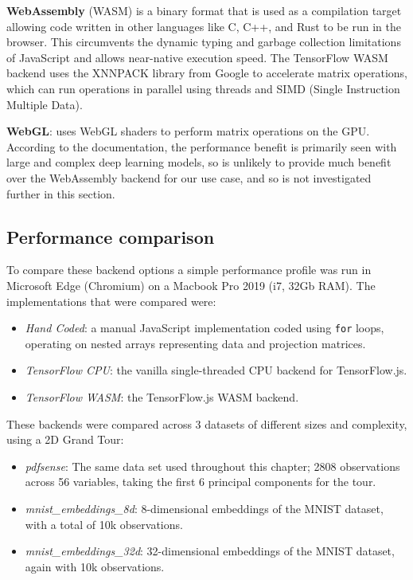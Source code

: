 \textbf{WebAssembly} (WASM) is a binary format that is used as a
compilation target allowing code written in other languages like C, C++,
and Rust to be run in the browser. This circumvents the dynamic typing
and garbage collection limitations of JavaScript and allows near-native
execution speed. The TensorFlow WASM backend uses the XNNPACK library
from Google to accelerate matrix operations, which can run operations in
parallel using threads and SIMD (Single Instruction Multiple Data).

\textbf{WebGL}: uses WebGL shaders to perform matrix operations on the
GPU. According to the documentation, the performance benefit is
primarily seen with large and complex deep learning models, so is
unlikely to provide much benefit over the WebAssembly backend for our
use case, and so is not investigated further in this section.

\hypertarget{performance-comparison}{%
\subsection{Performance comparison}\label{performance-comparison}}

To compare these backend options a simple performance profile was run in
Microsoft Edge (Chromium) on a Macbook Pro 2019 (i7, 32Gb RAM). The
implementations that were compared were:

\begin{itemize}
\tightlist
\item
  \emph{Hand Coded}: a manual JavaScript implementation coded using
  \texttt{for} loops, operating on nested arrays representing data and
  projection matrices.
\item
  \emph{TensorFlow CPU}: the vanilla single-threaded CPU backend for
  TensorFlow.js.
\item
  \emph{TensorFlow WASM}: the TensorFlow.js WASM backend.
\end{itemize}

These backends were compared across 3 datasets of different sizes and
complexity, using a 2D Grand Tour:

\begin{itemize}
\tightlist
\item
  \emph{pdfsense}: The same data set used throughout this chapter; 2808
  observations across 56 variables, taking the first 6 principal
  components for the tour.
\item
  \emph{mnist\_embeddings\_8d}: 8-dimensional embeddings of the MNIST
  dataset, with a total of 10k observations.
\item
  \emph{mnist\_embeddings\_32d}: 32-dimensional embeddings of the MNIST
  dataset, again with 10k observations.
\end{itemize}


